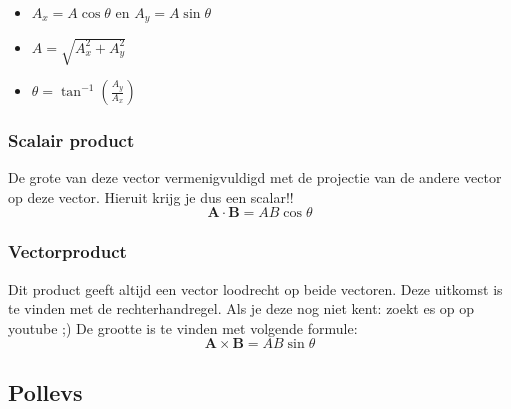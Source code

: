 \documentclass[12pt,a4paper]{article}
\begin{document}
    \begin{itemize}
        \item \(A_x = A\cos\theta\) en \(A_y = A\sin\theta\)
        \item \(A = \sqrt{A_x^2 + A_y^2}\)
        \item \(\theta = \tan^{-1}(\frac{A_y}{A_x})\)
    \end{itemize}

    \subsubsection{Scalair product}
    De grote van deze vector vermenigvuldigd met de projectie van de andere vector op deze vector. Hieruit krijg je dus een scalar!!
    \[\textbf{A} \cdot \textbf{B} = AB \cos\theta\]

    \subsubsection{Vectorproduct}
    Dit product geeft altijd een vector loodrecht op beide vectoren. Deze uitkomst is te vinden met de rechterhandregel. Als je deze nog niet kent: zoekt es op op youtube ;)
    De grootte is te vinden met volgende formule:
    \[\textbf{A} \times \textbf{B} = AB\sin\theta\]

    \subsection{Pollevs}
\end{document}
